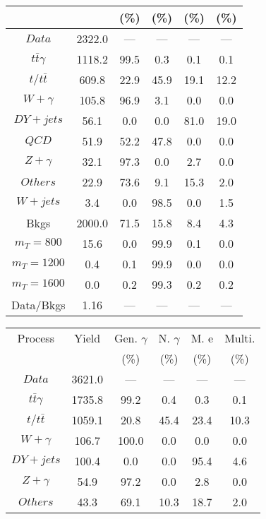 \begin{figure}
\begin{minipage}[c]{0.32\textwidth}
{\begin{tabular}{cccccc}
 &  & (\%) & (\%) & (\%) & (\%)  \\
\hline
                                                                      $ Data $ &  2322.0 &  --- &  --- &  --- &  ---\\
$ t\bar{t}\gamma $ &  1118.2 &  99.5 &  0.3 &  0.1 &  0.1\\
$ t/t\bar{t} $ &  609.8 &  22.9 &  45.9 &  19.1 &  12.2\\
$ W+\gamma $ &  105.8 &  96.9 &  3.1 &  0.0 &  0.0\\
$ DY+jets $ &  56.1 &  0.0 &  0.0 &  81.0 &  19.0\\
$ QCD $ &  51.9 &  52.2 &  47.8 &  0.0 &  0.0\\
$ Z+\gamma $ &  32.1 &  97.3 &  0.0 &  2.7 &  0.0\\
$ Others $ &  22.9 &  73.6 &  9.1 &  15.3 &  2.0\\
$ W+jets $ &  3.4 &  0.0 &  98.5 &  0.0 &  1.5\\
Bkgs &  2000.0 &  71.5 &  15.8 &  8.4 &  4.3\\
$ m_{T} = 800 $ &  15.6 &  0.0 &  99.9 &  0.1 &  0.0\\
$ m_{T} = 1200 $ &  0.4 &  0.1 &  99.9 &  0.0 &  0.0\\
$ m_{T} = 1600 $ &  0.0 &  0.2 &  99.3 &  0.2 &  0.2\\
Data/Bkgs &  1.16 &  --- &  --- &  --- &  ---\\
\hline
\end{tabular}
}
\end{minipage}
\begin{minipage}[c]{0.32\textwidth}
\centering
\tiny{
\begin{tabular}{cccccc}
\hline
Process & Yield & Gen. $\gamma$ & N. $\gamma$ & M. e & Multi. \\
 &  & (\%) & (\%) & (\%) & (\%)  \\
\hline
                                                                      $ Data $ &  3621.0 &  --- &  --- &  --- &  ---\\
$ t\bar{t}\gamma $ &  1735.8 &  99.2 &  0.4 &  0.3 &  0.1\\
$ t/t\bar{t} $ &  1059.1 &  20.8 &  45.4 &  23.4 &  10.3\\
$ W+\gamma $ &  106.7 &  100.0 &  0.0 &  0.0 &  0.0\\
$ DY+jets $ &  100.4 &  0.0 &  0.0 &  95.4 &  4.6\\
$ Z+\gamma $ &  54.9 &  97.2 &  0.0 &  2.8 &  0.0\\
$ Others $ &  43.3 &  69.1 &  10.3 &  18.7 &  2.0\\

\end{tabular}}
\end{minipage}
\end{figure}
